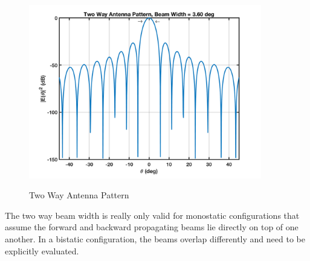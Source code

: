 \begin{figure}[H]
  \begin{center}
\includegraphics[width=4in]{../media/multistatic/sinc_antenna_pattern_two_way.png}
  \end{center}
  \renewcommand{\baselinestretch}{1} \small\normalsize
  \begin{quote}
    \caption[Two Way Antenna Pattern]{Two Way Antenna Pattern\label{rb_fig:5}}
  \end{quote}
\end{figure}
\renewcommand{\baselinestretch}{2} \small\normalsize
The two way beam width is really only valid for monostatic configurations that assume the forward and backward propagating beams lie directly on top of one another. In a bistatic configuration, the beams overlap differently and need to be explicitly evaluated.

